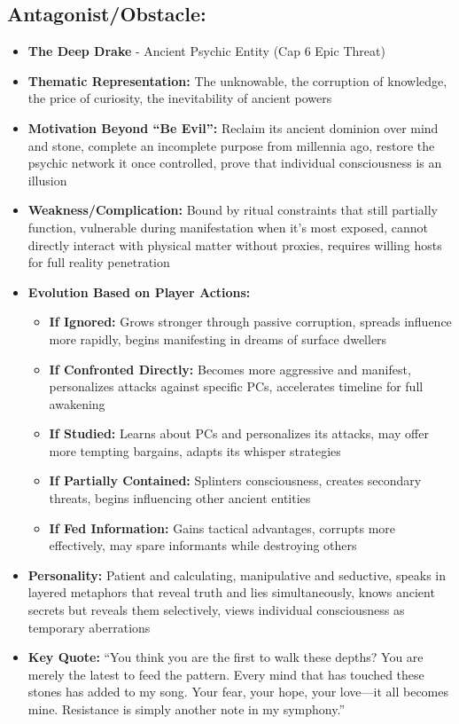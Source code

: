 \documentclass[11pt]{article}
\begin{document}
\subsection{Antagonist/Obstacle:}
\begin{itemize}
\item \textbf{The Deep Drake} - Ancient Psychic Entity (Cap 6 Epic Threat)
  \item \textbf{Thematic Representation:} The unknowable, the corruption of knowledge, the price of curiosity, the inevitability of ancient powers
  \item \textbf{Motivation Beyond ``Be Evil'':} Reclaim its ancient dominion over mind and stone, complete an incomplete purpose from millennia ago, restore the psychic network it once controlled, prove that individual consciousness is an illusion
  \item \textbf{Weakness/Complication:} Bound by ritual constraints that still partially function, vulnerable during manifestation when it's most exposed, cannot directly interact with physical matter without proxies, requires willing hosts for full reality penetration
  \item \textbf{Evolution Based on Player Actions:}
    \begin{itemize}
    \item \textbf{If Ignored:} Grows stronger through passive corruption, spreads influence more rapidly, begins manifesting in dreams of surface dwellers
    \item \textbf{If Confronted Directly:} Becomes more aggressive and manifest, personalizes attacks against specific PCs, accelerates timeline for full awakening
    \item \textbf{If Studied:} Learns about PCs and personalizes its attacks, may offer more tempting bargains, adapts its whisper strategies
    \item \textbf{If Partially Contained:} Splinters consciousness, creates secondary threats, begins influencing other ancient entities
    \item \textbf{If Fed Information:} Gains tactical advantages, corrupts more effectively, may spare informants while destroying others
    \end{itemize}
  \item \textbf{Personality:} Patient and calculating, manipulative and seductive, speaks in layered metaphors that reveal truth and lies simultaneously, knows ancient secrets but reveals them selectively, views individual consciousness as temporary aberrations
  \item \textbf{Key Quote:} ``You think you are the first to walk these depths? You are merely the latest to feed the pattern. Every mind that has touched these stones has added to my song. Your fear, your hope, your love---it all becomes mine. Resistance is simply another note in my symphony.''

\end{itemize}
\end{document}
